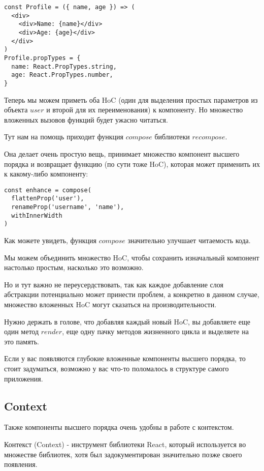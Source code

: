 \begin{lstlisting}
const Profile = ({ name, age }) => (
  <div>
    <div>Name: {name}</div>
    <div>Age: {age}</div>
  </div>
)
Profile.propTypes = {
  name: React.PropTypes.string,
  age: React.PropTypes.number,
}
\end{lstlisting}

Теперь мы можем приметь оба HoC (один для выделения простых параметров из объекта $user$ и второй для их переименования) к компоненту. Но множество вложенных вызовов функций будет ужасно читаться.

Тут нам на помощь приходит функция $compose$ библиотеки $recompose$.

Она делает очень простую вещь, принимает множество компонент высшего порядка и возвращает функцию (по сути тоже HoC), которая может применить их к какому-либо компоненту:

\begin{lstlisting}
const enhance = compose(
  flattenProp('user'),
  renameProp('username', 'name'),
  withInnerWidth
)
\end{lstlisting}

Как можете увидеть, функция $compose$ значительно улучшает читаемость кода.

Мы можем объединить множество HoC, чтобы сохранить изначальный компонент настолько простым, насколько это возможно.

Но и тут важно не переусердствовать, так как каждое добавление слоя абстракции потенциально может принести проблем, а конкретно в данном случае, множество вложенных HoC могут сказаться на производительности.

Нужно держать в голове, что добавляя каждый новый HoC, вы добавляете еще один метод $render$, еще одну пачку методов жизненного цикла и выделяете на это память.

Если у вас появляются глубокие вложенные компоненты высшего порядка, то стоит задуматься, возможно у вас что-то поломалось в структуре самого приложения.

\subsection{Context}

Также компоненты высшего порядка очень удобны в работе с контекстом.

Контекст (Context) - инструмент библиотеки React, который используется во множестве библиотек, хотя был задокументирован значительно позже своего появления.

